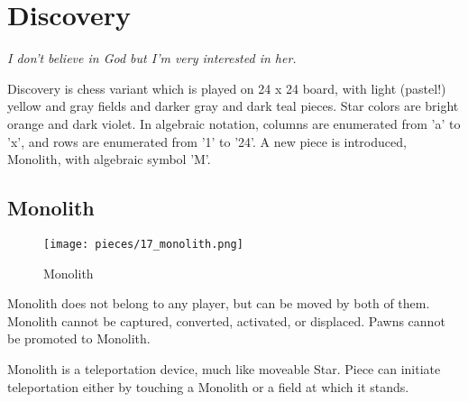 

\chapter*{Discovery}
\label{ch:Discovery}

\begin{flushright}
\parbox{0.8\textwidth}{
\emph{I don't believe in God but I'm very interested in her. \\
 } }
\end{flushright}

\noindent
Discovery is chess variant which is played on 24 x 24 board, with
light (pastel!) yellow and gray fields and darker gray and dark teal
pieces. Star colors are bright orange and dark violet. In algebraic
notation, columns are enumerated from 'a' to 'x', and rows are
enumerated from '1' to '24'. A new piece is introduced, Monolith,
with algebraic symbol 'M'.

\clearpage %

\section*{Monolith}
\label{sec:Discovery/Monolith}

\vspace*{-1.1\baselineskip}
\noindent
\begin{wrapfigure}[11]{l}{0.4\textwidth}
\centering
\texttt{[image: pieces/17\_monolith.png]}
\caption{Monolith}
\label{fig:17_monolith}
\end{wrapfigure}
Monolith does not belong to any player, but can be moved by both of them.
Monolith cannot be captured, converted, activated, or displaced.
Pawns cannot be promoted to Monolith.

Monolith is a teleportation device, much like moveable Star. Piece can
initiate teleportation either by touching a Monolith or a field at which
it stands.

